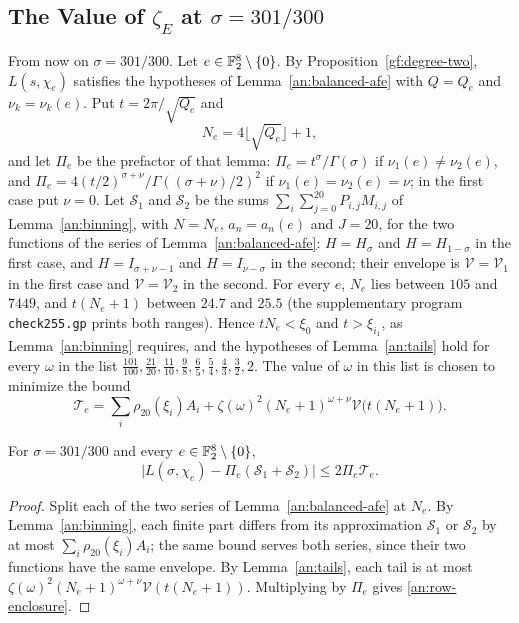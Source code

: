 \subsection{\texorpdfstring{The Value of $\zeta_E$ at $\sigma=301/300$}{The Value of zeta(E) at sigma = 301/300}}
\label{an:value-section}
From now on $\sigma=301/300$. Let $e\in\mathbb F_2^8\setminus\{0\}$. By
Proposition~\ref{gf:degree-two}, $L(s,\chi_e)$ satisfies the hypotheses of
Lemma~\ref{an:balanced-afe} with $Q=Q_e$ and $\nu_k=\nu_k(e)$. Put
$t=2\pi/\sqrt{Q_e}$ and
\[
 N_e=4\lfloor\sqrt{Q_e}\rfloor+1,
\]
and let $\Pi_e$ be the prefactor of that lemma:
$\Pi_e=t^\sigma/\Gamma(\sigma)$ if $\nu_1(e)\ne\nu_2(e)$, and
$\Pi_e=4(t/2)^{\sigma+\nu}/\Gamma((\sigma+\nu)/2)^2$ if
$\nu_1(e)=\nu_2(e)=\nu$; in the first case put $\nu=0$. Let
$\mathcal S_1$ and $\mathcal S_2$ be the sums
$\sum_i\sum_{j=0}^{20}P_{i,j}M_{i,j}$ of Lemma~\ref{an:binning}, with
$N=N_e$, $a_n=a_n(e)$ and $J=20$, for the two functions of the series of
Lemma~\ref{an:balanced-afe}: $H=H_\sigma$ and $H=H_{1-\sigma}$ in the first
case, and $H=I_{\sigma+\nu-1}$ and $H=I_{\nu-\sigma}$ in the second; their
envelope is $\mathcal V=\mathcal V_1$ in the first case and
$\mathcal V=\mathcal V_2$ in the second. For every $e$, $N_e$ lies between
$105$ and $7449$, and $t(N_e+1)$ between $24.7$ and $25.5$ (the
supplementary program \texttt{check255.gp} prints both ranges). Hence
$tN_e<\xi_0$ and $t>\xi_{i_1}$, as Lemma~\ref{an:binning} requires, and the
hypotheses of Lemma~\ref{an:tails} hold for every $\omega$ in the list
$\frac{101}{100},\frac{21}{20},\frac{11}{10},\frac98,\frac65,\frac54,
\frac43,\frac32,2$. The value of $\omega$ in this list is chosen to minimize
the bound
\[
 \mathcal T_e=\sum_i\rho_{20}(\xi_i)A_i
 +\zeta(\omega)^2(N_e+1)^{\omega+\nu}\mathcal V\bigl(t(N_e+1)\bigr).
\]

\begin{lemma}\label{an:row}
For $\sigma=301/300$ and every $e\in\mathbb F_2^8\setminus\{0\}$,
\begin{equation}\label{an:row-enclosure}
 \bigl|L(\sigma,\chi_e)-\Pi_e(\mathcal S_1+\mathcal S_2)\bigr|
 \le2\Pi_e\mathcal T_e.
\end{equation}
\end{lemma}

\begin{proof}
Split each of the two series of Lemma~\ref{an:balanced-afe} at $N_e$. By
Lemma~\ref{an:binning}, each finite part differs from its approximation
$\mathcal S_1$ or $\mathcal S_2$ by at most $\sum_i\rho_{20}(\xi_i)A_i$; the
same bound serves both series, since their two functions have the same
envelope. By Lemma~\ref{an:tails}, each tail is at most
$\zeta(\omega)^2(N_e+1)^{\omega+\nu}\mathcal V(t(N_e+1))$. Multiplying by
$\Pi_e$ gives \eqref{an:row-enclosure}.
\end{proof}

